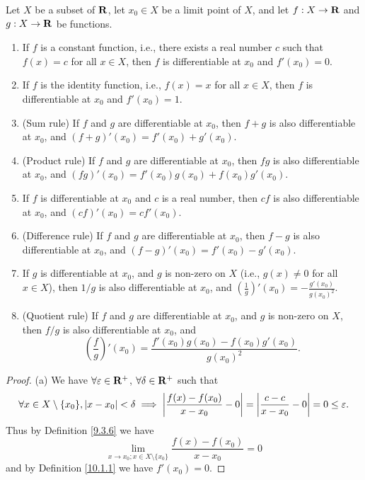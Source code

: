 \begin{theorem}\label{10.1.13}
    Let \(X\) be a subset of \(\mathbf{R}\), let \(x_0 \in X\) be a limit point of \(X\), and let \(f : X \to \mathbf{R}\) and \(g : X \to \mathbf{R}\) be functions.
    \begin{enumerate}
        \item If \(f\) is a constant function, i.e., there exists a real number \(c\) such that \(f(x) = c\) for all \(x \in X\), then \(f\) is differentiable at \(x_0\) and \(f'(x_0) = 0\).
        \item If \(f\) is the identity function, i.e., \(f(x) = x\) for all \(x \in X\), then \(f\) is differentiable at \(x_0\) and \(f'(x_0) = 1\).
        \item (Sum rule)
              If \(f\) and \(g\) are differentiable at \(x_0\), then \(f + g\) is also differentiable at \(x_0\), and \((f + g)'(x_0) = f'(x_0) + g'(x_0)\).
        \item (Product rule)
              If \(f\) and \(g\) are differentiable at \(x_0\), then \(fg\) is also differentiable at \(x_0\), and \((fg)'(x_0) = f'(x_0)g(x_0) + f(x_0)g'(x_0)\).
        \item If \(f\) is differentiable at \(x_0\) and \(c\) is a real number, then \(cf\) is also differentiable at \(x_0\), and \((cf)'(x_0) = cf'(x_0)\).
        \item (Difference rule)
              If \(f\) and \(g\) are differentiable at \(x_0\), then \(f - g\) is also differentiable at \(x_0\), and \((f - g)'(x_0) = f'(x_0) - g'(x_0)\).
        \item If \(g\) is differentiable at \(x_0\), and \(g\) is non-zero on \(X\) (i.e., \(g(x) \neq 0\) for all \(x \in X\)), then \(1 / g\) is also differentiable at \(x_0\), and \((\frac{1}{g})'(x_0) = -\frac{g'(x_0)}{g(x_0)^2}\).
        \item (Quotient rule)
              If \(f\) and \(g\) are differentiable at \(x_0\), and \(g\) is non-zero on \(X\), then \(f / g\) is also differentiable at \(x_0\), and
              \[
                  (\frac{f}{g})'(x_0) = \frac{f'(x_0) g(x_0) - f(x_0) g'(x_0)}{g(x_0)^2}.
              \]
    \end{enumerate}
\end{theorem}

\begin{proof}{(a)}
    We have \(\forall \varepsilon \in \mathbf{R}^+\), \(\forall \delta \in \mathbf{R}^+\) such that
    \[
        \forall x \in X \setminus \{x_0\}, \left\lvert x - x_0\right\rvert < \delta \implies \left\lvert\frac{f(x) - f(x_0)}{x - x_0} - 0\right\rvert = \left\lvert\frac{c - c}{x - x_0} - 0\right\rvert = 0 \leq \varepsilon.
    \]
    Thus by Definition \ref{9.3.6} we have
    \[
        \lim_{x \to x_0 ; x \in X \setminus \{x_0\}} \frac{f(x) - f(x_0)}{x - x_0} = 0
    \]
    and by Definition \ref{10.1.1} we have \(f'(x_0) = 0\).
\end{proof}

